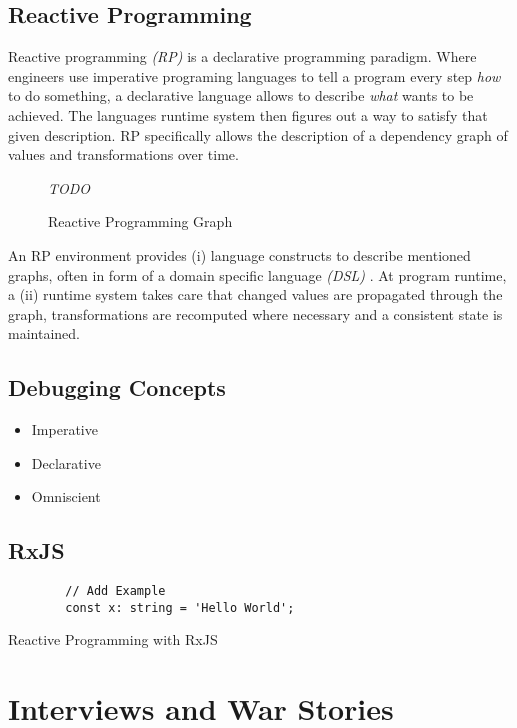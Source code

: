 \documentclass[12pt,a4paper]{article}
\begin{document}
\subsection{Reactive Programming}

Reactive programming \emph{(RP)} is a declarative programming paradigm. Where engineers use imperative programing languages to tell a program every step \emph{how} to do something, a declarative language allows to describe \emph{what} wants to be achieved. The languages runtime system then figures out a way to satisfy that given description. RP specifically allows the description of a dependency graph of values and transformations over time.

\begin{figure}[h]
	\centering
	\emph{TODO}

	\caption{Reactive Programming Graph}
	\label{fig:reactive-programming}
\end{figure}

An RP environment provides (i) language constructs to describe mentioned graphs, often in form of a domain specific language \emph{(DSL)} \cite{REScala} \cite{otherRPDSL}. At program runtime, a (ii) runtime system takes care that changed values are propagated through the graph, transformations are recomputed where necessary and a consistent state is maintained.

\subsection{Debugging Concepts}

\begin{itemize}
	\item Imperative
	\item Declarative
	\item Omniscient
\end{itemize}

\subsection{RxJS}

\begin{listing}[H]
	\begin{verbatim}
		// Add Example
		const x: string = 'Hello World';
	\end{verbatim}
	\caption{Reactive Programming with RxJS}
	\label{lst:rp-with-rxjs}
\end{listing}


\section{Interviews and War Stories}
\label{sec:interviews}
\end{document}
